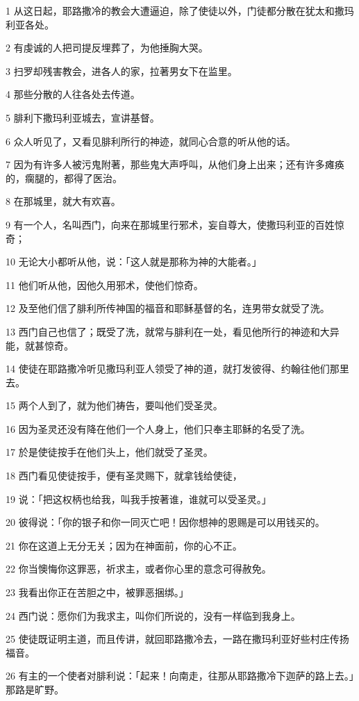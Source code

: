 \par 1 从这日起，耶路撒冷的教会大遭逼迫，除了使徒以外，门徒都分散在犹太和撒玛利亚各处。
\par 2 有虔诚的人把司提反埋葬了，为他捶胸大哭。
\par 3 扫罗却残害教会，进各人的家，拉著男女下在监里。
\par 4 那些分散的人往各处去传道。
\par 5 腓利下撒玛利亚城去，宣讲基督。
\par 6 众人听见了，又看见腓利所行的神迹，就同心合意的听从他的话。
\par 7 因为有许多人被污鬼附著，那些鬼大声呼叫，从他们身上出来；还有许多瘫痪的，瘸腿的，都得了医治。
\par 8 在那城里，就大有欢喜。
\par 9 有一个人，名叫西门，向来在那城里行邪术，妄自尊大，使撒玛利亚的百姓惊奇；
\par 10 无论大小都听从他，说：「这人就是那称为神的大能者。」
\par 11 他们听从他，因他久用邪术，使他们惊奇。
\par 12 及至他们信了腓利所传神国的福音和耶稣基督的名，连男带女就受了洗。
\par 13 西门自己也信了；既受了洗，就常与腓利在一处，看见他所行的神迹和大异能，就甚惊奇。
\par 14 使徒在耶路撒冷听见撒玛利亚人领受了神的道，就打发彼得、约翰往他们那里去。
\par 15 两个人到了，就为他们祷告，要叫他们受圣灵。
\par 16 因为圣灵还没有降在他们一个人身上，他们只奉主耶稣的名受了洗。
\par 17 於是使徒按手在他们头上，他们就受了圣灵。
\par 18 西门看见使徒按手，便有圣灵赐下，就拿钱给使徒，
\par 19 说：「把这权柄也给我，叫我手按著谁，谁就可以受圣灵。」
\par 20 彼得说：「你的银子和你一同灭亡吧！因你想神的恩赐是可以用钱买的。
\par 21 你在这道上无分无关；因为在神面前，你的心不正。
\par 22 你当懊悔你这罪恶，祈求主，或者你心里的意念可得赦免。
\par 23 我看出你正在苦胆之中，被罪恶捆绑。」
\par 24 西门说：愿你们为我求主，叫你们所说的，没有一样临到我身上。
\par 25 使徒既证明主道，而且传讲，就回耶路撒冷去，一路在撒玛利亚好些村庄传扬福音。
\par 26 有主的一个使者对腓利说：「起来！向南走，往那从耶路撒冷下迦萨的路上去。」那路是旷野。
